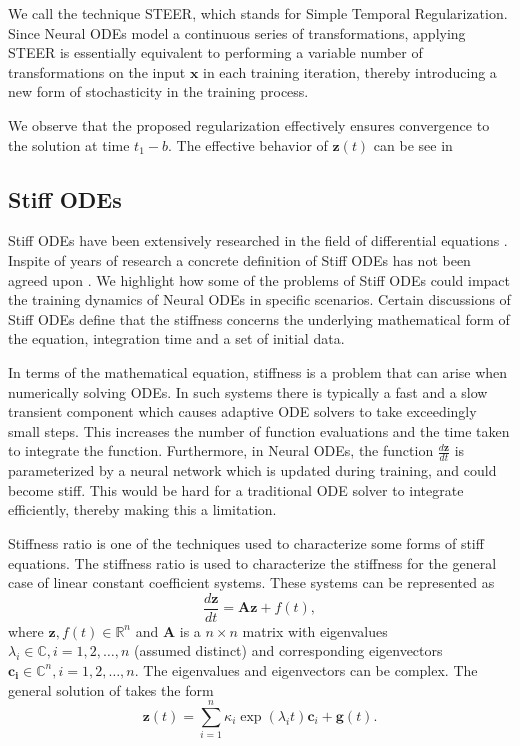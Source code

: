 We call the technique STEER, which stands for Simple Temporal Regularization. 
Since Neural ODEs model a continuous series of transformations, applying STEER is essentially equivalent to performing a variable number of transformations on the input $\mathbf{x}$ in each training iteration, thereby introducing a new form of stochasticity in the training process.

We observe that the proposed regularization effectively ensures convergence to the solution at time $t_1-b$. The effective behavior of $\mathbf{z}(t)$ can be see in  

\subsection{Stiff ODEs} 
\label{subsection:stiff_ode}

Stiff ODEs have been extensively researched in the field of differential equations \cite{brugnano2011fifty}. Inspite of years of research a concrete definition of Stiff ODEs has not been agreed upon \cite{soderlind2015stiffness}. We highlight how some of the problems of Stiff ODEs could impact the training dynamics of Neural ODEs in specific scenarios. Certain discussions of Stiff ODEs define that the stiffness concerns the underlying mathematical form of the equation, integration time and a set of initial data.

In terms of the mathematical equation, stiffness is a problem that can arise when numerically solving ODEs. In such systems there is typically a fast and a slow transient component which causes adaptive ODE solvers to take exceedingly small steps. This increases the number of function evaluations and the time taken to integrate the function. %
Furthermore, in Neural ODEs, the function $\frac{d \mathbf{z} }{ dt }$ is parameterized by a neural network which is updated during training, and could become stiff. This would be hard for a traditional ODE solver to integrate efficiently, thereby making this a limitation.


Stiffness ratio is one of the techniques used to characterize some forms of stiff equations. The stiffness ratio is used to characterize the stiffness for the general case of linear constant coefficient systems. These systems can be represented as 
\begin{equation}
	\frac{d \mathbf{z} }{ dt } = \mathbf{Az} + f(t),
	\label{eq:stiff}
\end{equation}
where $\mathbf {z} ,f(t) \in \mathbb{R} ^{n}$ and $\mathbf {A}$ is a $n\times n$ matrix with eigenvalues  $\lambda_{i}\in \mathbb{C} ,i=1,2,\ldots ,n$ (assumed distinct) and corresponding eigenvectors  $\mathbf {c_{i}} \in \mathbb{C} ^{n},i=1,2,\ldots ,n$. The eigenvalues and eigenvectors can be complex. 
The general solution of  takes the form
\begin{equation}
	\mathbf {z}(t)=\sum_{i=1}^{n}\kappa_{i}\exp(\lambda _{i}t) \mathbf{c}_{i}+ \mathbf{g}(t) .
\end{equation}

